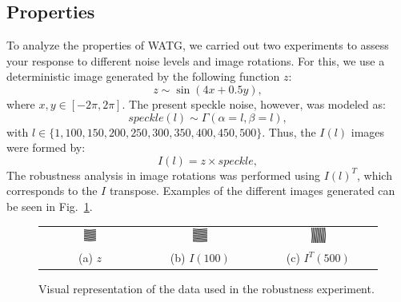 \documentclass[journal]{IEEEtran}
\begin{document}
	\subsection{Properties}
	
	To analyze the properties of WATG, we carried out two experiments to assess your response to different noise levels and image rotations.
    For this, we use a deterministic image generated by the following function $z$:
	\begin{equation*}
	    z \sim \sin (4x + 0.5y), 
	\end{equation*}
	where  $x, y \in [-2\pi, 2\pi]$.
	The present speckle noise, however, was modeled as:
	\begin{equation*}
	    speckle(l) \sim \Gamma(\alpha = l, \beta = l),
	\end{equation*}
	with $l \in \{1, 100, 150, 200, 250, 300, 350, 400, 450, 500\}$.
	Thus, the $I(l)$ images were formed by:
	\begin{equation*}
	    I(l) = z \times speckle,
	\end{equation*}
	The robustness analysis in image rotations was performed using $I(l)^T$, which corresponds to the $I$ transpose.
	Examples of the different images generated can be seen in Fig.~\ref{fig:speckle}.
	
	\begin{figure}[hbt]
		\begin{tabular}{ccc}
			\includegraphics[width=0.135\textwidth]{Figures/z.png} &   
			\includegraphics[width=0.135\textwidth]{Figures/z100.png} &
			\includegraphics[width=0.135\textwidth]{Figures/z500t.png} \\
			(a) $z$ &   
			(b) $I(100)$ &
			(c) $I^T(500)$ \\
		\end{tabular}
		\caption{Visual representation of the data used in the robustness experiment.}
		\label{fig:speckle}
	\end{figure}
\end{document}
